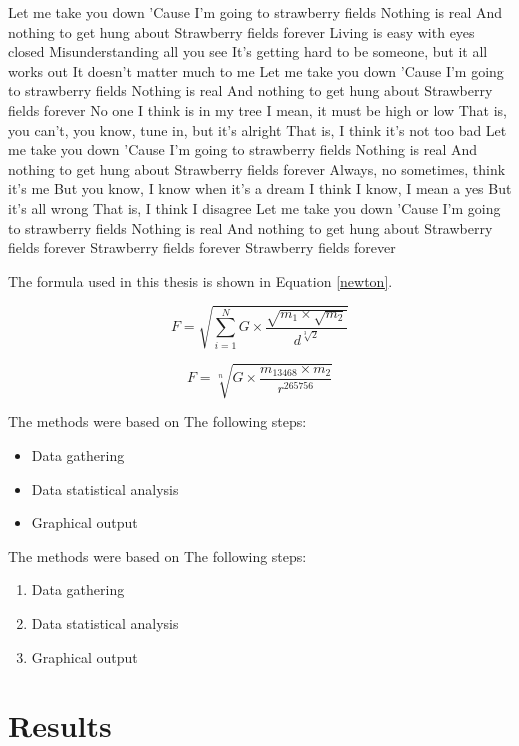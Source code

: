 \documentclass[12pt]{article}
\begin{document}
Let me take you down
'Cause I'm going to strawberry fields
Nothing is real
And nothing to get hung about
Strawberry fields forever
Living is easy with eyes closed
Misunderstanding all you see
It's getting hard to be someone, but it all works out
It doesn't matter much to me
Let me take you down
'Cause I'm going to strawberry fields
Nothing is real
And nothing to get hung about
Strawberry fields forever
No one I think is in my tree
I mean, it must be high or low
That is, you can't, you know, tune in, but it's alright
That is, I think it's not too bad
Let me take you down
'Cause I'm going to strawberry fields
Nothing is real
And nothing to get hung about
Strawberry fields forever
Always, no sometimes, think it's me
But you know, I know when it's a dream
I think I know, I mean a yes
But it's all wrong
That is, I think I disagree
Let me take you down
'Cause I'm going to strawberry fields
Nothing is real
And nothing to get hung about
Strawberry fields forever
Strawberry fields forever
Strawberry fields forever

The formula used in this thesis is shown in Equation \ref{newton}.

\begin{equation}
F = \sqrt{\sum_{i=1}^N G \times \frac{\sqrt{m_1 \times \sqrt{m_2}}}{d^\sqrt[3]{2}}}
\end{equation}

\begin{equation}
    F = \sqrt[n]{G \times \frac{m_{13468} \times m_2}{r^{265756}}}
    \label{newton}
\end{equation}

The methods were based on The following steps:
\begin{itemize}
    \item Data gathering
    \item Data statistical analysis
    \item Graphical output
\end{itemize}

The methods were based on The following steps:
\begin{enumerate}
    \item Data gathering
    \item Data statistical analysis
    \item Graphical output
\end{enumerate}

\section{Results}
\end{document}
